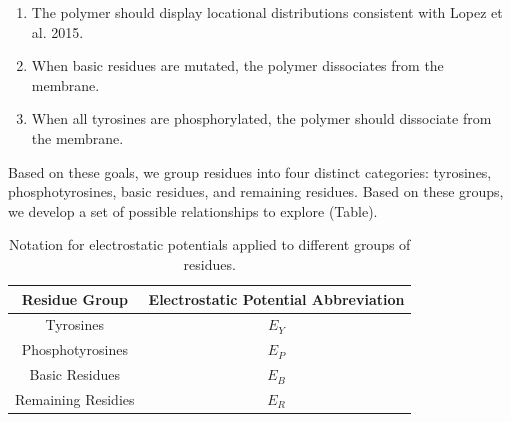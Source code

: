 \documentclass[../../AdvancementSummary.tex]{subfiles}
\begin{document}
\begin{enumerate}
	\item The polymer should display locational distributions consistent with Lopez et al. 2015. \cite{Lopez2015}
	\item When basic residues are mutated, the polymer dissociates from the membrane. \cite{Zhang2011}
	\item When all tyrosines are phosphorylated, the polymer should dissociate from the membrane. 
\end{enumerate}

Based on these goals, we group residues into four distinct categories: tyrosines, phosphotyrosines, basic residues, and remaining residues. Based on these groups, we develop a set of possible relationships to explore (Table).  

\begin{table}[H]
\caption{Notation for electrostatic potentials applied to different groups of residues. \label{table: ElecPotentialNotation}}
\begin{center}
\begin{tabular}{ c | c}
\hline
Residue Group & Electrostatic Potential Abbreviation \\
\hline
Tyrosines & $E_Y$ \\
Phosphotyrosines & $E_P$ \\
Basic Residues & $E_B$ \\
Remaining Residies & $E_R$ \\
\hline
\end{tabular}
\end{center}
\end{table}
\end{document}
